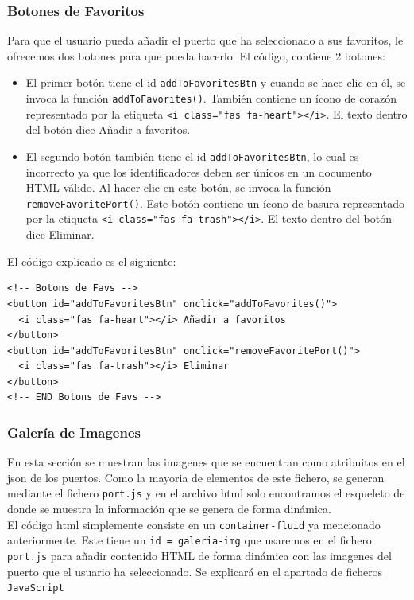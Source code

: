 \documentclass{article}
\begin{document}
\subsubsection{Botones de Favoritos}
Para que el usuario pueda añadir el puerto que ha seleccionado a sus favoritos, le ofrecemos dos botones para que pueda hacerlo. El código, contiene 2 botones:
\begin{itemize}
\item El primer botón tiene el id \texttt{addToFavoritesBtn} y cuando se hace clic en él, se invoca la función \texttt{addToFavorites()}. También contiene un ícono de corazón representado por la etiqueta \texttt{<i class="fas fa-heart"></i>}. El texto dentro del botón dice Añadir a favoritos.

\item El segundo botón también tiene el id \texttt{addToFavoritesBtn}, lo cual es incorrecto ya que los identificadores deben ser únicos en un documento HTML válido. Al hacer clic en este botón, se invoca la función \texttt{removeFavoritePort()}. Este botón contiene un ícono de basura representado por la etiqueta \texttt{<i class="fas fa-trash"></i>}. El texto dentro del botón dice Eliminar.\\
\end{itemize}

\noindent El código explicado es el siguiente:
\begin{verbatim}
<!-- Botons de Favs -->
<button id="addToFavoritesBtn" onclick="addToFavorites()">
  <i class="fas fa-heart"></i> Añadir a favoritos
</button>
<button id="addToFavoritesBtn" onclick="removeFavoritePort()">
  <i class="fas fa-trash"></i> Eliminar
</button>
<!-- END Botons de Favs -->
\end{verbatim}

\subsubsection{Galería de Imagenes}
En esta sección se muestran las imagenes que se encuentran como atribuitos en el json de los puertos. Como la mayoria de elementos de este fichero, se generan mediante el fichero \texttt{port.js} y en el archivo html solo encontramos el esqueleto de donde se muestra la información que se genera de forma dinámica.\\

\noindent El código html simplemente consiste en un \texttt{container-fluid} ya mencionado anteriormente. Este tiene un \texttt{id = galeria-img} que usaremos en el fichero \texttt{port.js} para añadir contenido HTML de forma dinámica con las imagenes del puerto que el usuario ha seleccionado. Se explicará en el apartado de ficheros \texttt{JavaScript}\\
\end{document}
